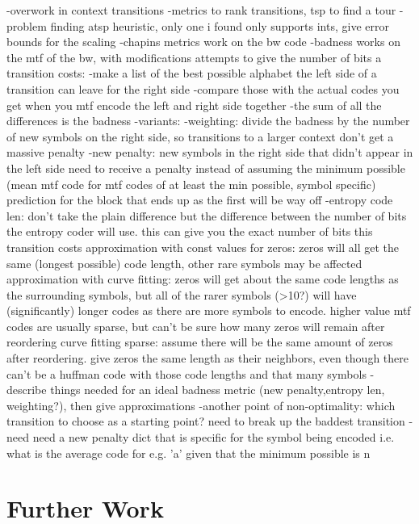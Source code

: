 \documentclass[a4paper]{scrreprt}
\begin{document}
-overwork in context transitions
-metrics to rank transitions, tsp to find a tour
-problem finding atsp heuristic, only one i found only supports ints, give 
	error bounds for the scaling
-chapins metrics work on the bw code
-badness works on the mtf of the bw, with modifications attempts to give the
	number of bits a transition costs:
	-make a list of the best possible alphabet the left side of a transition
		can leave for the right side
	-compare those with the actual codes you get when you mtf encode the left
		and right side together
	-the sum of all the differences is the badness
	-variants:
		-weighting: divide the badness by the number of new symbols on the right
			side, so transitions to a larger context don't get a massive
			penalty
		-new penalty: new symbols in the right side that didn't appear in the
			left side need to receive a penalty instead of assuming the minimum
			possible (mean mtf code for mtf codes of at least the min possible,
			symbol specific)
			prediction for the block that ends up as the first will be way off
		-entropy code len: don't take the plain difference but the difference
			between the number of bits the entropy coder will use. this can
			give you the exact number of bits this transition costs
			approximation with const values for zeros: zeros will all get the
			same (longest possible) code length, other rare symbols may be
			affected
			approximation with curve fitting: zeros will get about the same
			code lengths as the surrounding symbols, but all of the rarer
			symbols (>10?) will have (significantly) longer codes as there are
			more symbols to encode. higher value mtf codes are usually sparse,
			but can't be sure how many zeros will remain after reordering
			curve fitting sparse: assume there will be the same amount of
			zeros after reordering. give zeros the same length as their
			neighbors, even though there can't be a huffman code with those
			code lengths and that many symbols 
	-describe things needed for an ideal badness metric (new penalty,entropy
		len, weighting?), then give approximations
	-another point of non-optimality: which transition to choose as a starting
		point? need to break up the baddest transition
	-need need a new penalty dict that is specific for the symbol being encoded
		i.e. what is the average code for e.g. 'a' given that the minimum
		possible is n


\section{Further Work}
\end{document}
